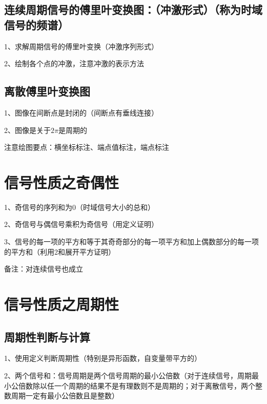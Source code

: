 \subsection{连续周期信号的傅里叶变换图：（冲激形式）（称为时域信号的频谱）}

1、求解周期信号的傅里叶变换（冲激序列形式）

2、绘制各个点的冲激，注意冲激的表示方法



\subsection{离散傅里叶变换图}

1、图像在间断点是封闭的（间断点有垂线连接）

2、图像是关于$2\pi$是周期的



注意绘图要点：横坐标标注、端点值标注，端点标注

\section{信号性质之奇偶性}

1、奇信号的序列和为0（时域信号大小的总和）

2、奇信号与偶信号乘积为奇信号（用定义证明）

3、信号的每一项的平方和等于其奇奇部分的每一项平方和加上偶数部分的每一项的平方和（利用2和展开平方证明）

备注：对连续信号也成立

\section{信号性质之周期性}



\subsection{周期性判断与计算}

1、使用定义判断周期性（特别是异形函数，自变量带平方的）

2、两个信号和：信号周期是两个信号周期的最小公倍数（对于连续信号，周期最小公倍数除以任一个周期的结果不是有理数则不是周期的；对于离散信号，两个整数周期一定有最小公倍数且是整数）

